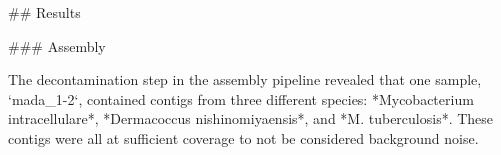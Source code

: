 \begin{markdown}


## Results

### Assembly

The decontamination step in the assembly pipeline revealed that one sample, `mada_1-2`, contained contigs from three different species: *Mycobacterium intracellulare*, *Dermacoccus nishinomiyaensis*, and *M. tuberculosis*. These contigs were all at sufficient coverage to not be considered background noise.




\end{markdown}